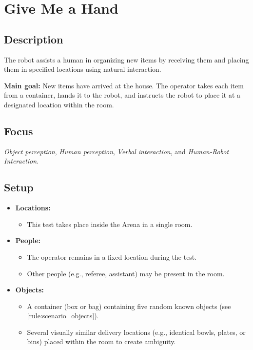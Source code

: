 \section{Give Me a Hand}\label{test:give-me-a-hand}

\subsection*{Description}
The robot assists a human in organizing new items by receiving them and placing them in specified locations using natural interaction.

\textbf{Main goal:}
New items have arrived at the house. The operator takes each item from a container, hands it to the robot, and instructs the robot to place it at a designated location within the room.

\subsection*{Focus}
\emph{Object perception}, \emph{Human perception}, \emph{Verbal interaction}, and \emph{Human-Robot Interaction}.

\subsection*{Setup}
\begin{itemize}[nosep]	
	\item \textbf{Locations:} 
	\begin{itemize}
		\item This test takes place inside the Arena in a single room.
	\end{itemize}	 
	\item \textbf{People:} 
	\begin{itemize}
		\item The operator remains in a fixed location during the test.
		\item Other people (e.g., referee, assistant) may be present in the room.
	\end{itemize}
	\item \textbf{Objects:}
		\begin{itemize}
			\item A container (box or bag) containing five random known objects (see \ref{rule:scenario_objects}).
			\item Several visually similar delivery locations (e.g., identical bowls, plates, or bins) placed within the room to create ambiguity.
		\end{itemize}
\end{itemize}

